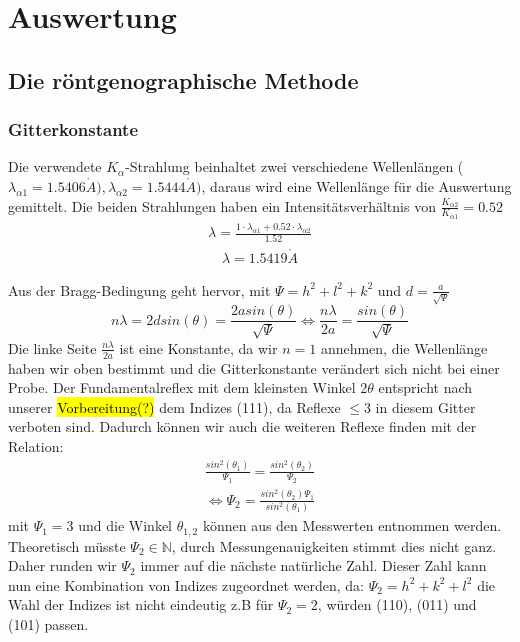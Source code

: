 \section{Auswertung}
    \subsection{Die röntgenographische Methode}
        \subsubsection{Gitterkonstante}
            Die verwendete $K_{\alpha}$-Strahlung beinhaltet zwei verschiedene Wellenlängen ($\lambda_{\alpha 1} = 1.5406 \mathring{A}), \lambda_{\alpha 2} = 1.5444 \mathring{A})$,
            daraus wird eine Wellenlänge
            für die Auswertung gemittelt. Die beiden Strahlungen haben ein Intensitätsverhältnis von $\frac{K_{\alpha 2}}{K_{\alpha 1}} = 0.52$
            \begin{align}
                \lambda = \frac{1 \cdot \lambda_{\alpha 1} + 0.52 \cdot \lambda_{\alpha 2}}{1.52}
            \end{align}
            \begin{align*}
                \lambda = 1.5419 \mathring{A}
            \end{align*}

            Aus der Bragg-Bedingung geht hervor, mit $\Psi =  h^2 + l^2 + k^2$ und $d = \frac{a}{\sqrt{\Psi}}$
            \begin{equation}
                n \lambda = 2dsin(\theta) = \frac{2asin(\theta)}{\sqrt{\Psi}} \Leftrightarrow \frac{n \lambda}{2a} = \frac{sin(\theta)}{\sqrt{\Psi}}
            \end{equation}
            Die linke Seite $\frac{n \lambda}{2a}$ ist eine Konstante, da wir $n=1$ annehmen, die Wellenlänge haben wir oben 
            bestimmt und die Gitterkonstante verändert sich nicht bei einer Probe. Der Fundamentalreflex mit dem kleinsten Winkel
            $2\theta$ entspricht nach unserer \hl{Vorbereitung(?)} dem Indizes (111), da Reflexe $\leq 3$ in diesem Gitter
            verboten sind. Dadurch können wir auch die 
            weiteren Reflexe finden mit der Relation:
            \begin{align}
                \frac{sin^2(\theta_1)}{\Psi_1} = \frac{sin^2(\theta_2)}{\Psi_2} \\
                \Leftrightarrow \Psi_2 = \frac{sin^2(\theta_2)\Psi_1}{sin^2(\theta_1)}
            \end{align}
            mit $\Psi_1 = 3$ und die Winkel $\theta_{1,2}$ können aus den Messwerten entnommen werden. Theoretisch
            müsste $\Psi_2 \in \mathbb{N}$, durch Messungenauigkeiten stimmt dies nicht ganz. Daher runden wir $\Psi_2$ immer auf die 
            nächste natürliche Zahl. Dieser Zahl kann nun eine Kombination von Indizes zugeordnet werden, da:
            $\Psi_2 = h^2+k^2+l^2$ die Wahl der Indizes ist nicht eindeutig z.B für $\Psi_2 = 2$, würden (110), (011) und (101) passen.
            
